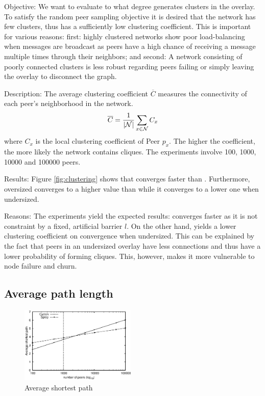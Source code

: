 \begin{asparadesc}
\item[Objective:] We want to evaluate to what degree \SCAMPLON{} generates
  clusters in the overlay.  To satisfy the random peer sampling objective it is
  desired that the network has few clusters, thus has a sufficiently low
  clustering coefficient.  This is important for various reasons: first: highly
  clustered networks show poor load-balancing when messages are broadcast as
  peers have a high chance of receiving a message multiple times through their
  neighbors; and second: A network consisting of poorly connected clusters is
  less robust regarding peers failing or simply leaving the overlay to
  disconnect the graph.
\item[Description:] The average clustering coefficient $\overline{C}$ measures
  the connectivity of each peer's neighborhood in the network.
  \begin{equation}
    \overline{C} = {1\over |\mathcal{N}|}\sum\limits_{x\in\mathcal{N}}C_x
  \end{equation}
  where $C_x$ is the local clustering coefficient of Peer $p_x$. The higher the
  coefficient, the more likely the network contains cliques.  The experiments
  involve 100, 1000, 10000 and 100000 peers.
\item[Results:] Figure \ref{fig:clustering} shows that \SCAMPLON{} converges
  faster than \CYCLON{}.  Furthermore, oversized \CYCLON{} converges to a
  higher value than \SCAMPLON while it converges to a lower one when
  undersized.
\item[Reasons:] The experiments yield the expected results: \SCAMPLON{}
  converges faster as it is not constraint by a fixed, artificial barrier
  $l$.  On the other hand, \CYCLON{} yields a lower clustering coefficient on
  convergence when undersized.  This can be explained by the fact that peers in
  an undersized \CYCLON{} overlay have less connections and thus have a lower
  probability of forming cliques.  This, however, makes it more vulnerable to
  node failure and churn.
\end{asparadesc}

\subsection{Average path length}
\label{subsec:avg}
\begin{figure}
  \centering
  \includegraphics[width=0.49\textwidth]{img/avgpath.eps}
  \caption{\label{fig:avgpath}Average shortest path}
\end{figure}

